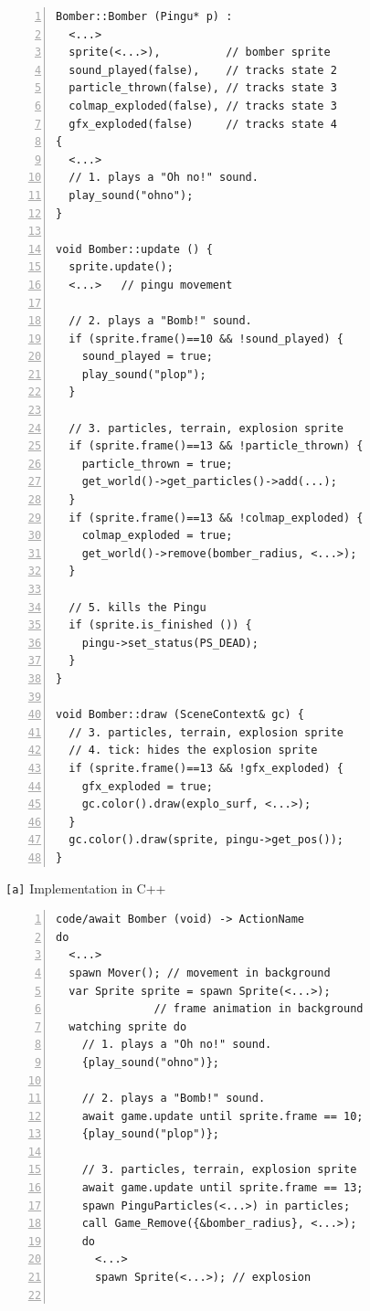 \documentclass{vgtc}                          %
\newcommand{\code}[1] {{\small{\texttt{#1}}}}
\newcommand{\ax}{\code{[a]}\xspace}
\begin{document}
\begin{figure}[th!]
\begin{minipage}[t]{0.50\linewidth}
\begin{lstlisting}[numbers=left,xleftmargin=3em]
Bomber::Bomber (Pingu* p) :
  <...>
  sprite(<...>),          // bomber sprite
  sound_played(false),    // tracks state 2
  particle_thrown(false), // tracks state 3
  colmap_exploded(false), // tracks state 3
  gfx_exploded(false)     // tracks state 4
{
  <...>
  // 1. plays a "Oh no!" sound.
  play_sound("ohno");
}

void Bomber::update () {
  sprite.update();
  <...>   // pingu movement

  // 2. plays a "Bomb!" sound.
  if (sprite.frame()==10 && !sound_played) {
    sound_played = true;
    play_sound("plop");
  }

  // 3. particles, terrain, explosion sprite
  if (sprite.frame()==13 && !particle_thrown) {
    particle_thrown = true;
    get_world()->get_particles()->add(...);
  }
  if (sprite.frame()==13 && !colmap_exploded) {
    colmap_exploded = true;
    get_world()->remove(bomber_radius, <...>);
  }

  // 5. kills the Pingu
  if (sprite.is_finished ()) {
    pingu->set_status(PS_DEAD);
  }
}

void Bomber::draw (SceneContext& gc) {
  // 3. particles, terrain, explosion sprite
  // 4. tick: hides the explosion sprite
  if (sprite.frame()==13 && !gfx_exploded) {
    gfx_exploded = true;
    gc.color().draw(explo_surf, <...>);
  }
  gc.color().draw(sprite, pingu->get_pos());
}
\end{lstlisting}
\centering\small{\ax Implementation in C++}
\end{minipage}
%
\begin{minipage}[t]{0.50\linewidth}
\begin{lstlisting}[numbers=left,xleftmargin=3em]
code/await Bomber (void) -> ActionName
do
  <...>
  spawn Mover(); // movement in background
  var Sprite sprite = spawn Sprite(<...>);
               // frame animation in background
  watching sprite do
    // 1. plays a "Oh no!" sound.
    {play_sound("ohno")};

    // 2. plays a "Bomb!" sound.
    await game.update until sprite.frame == 10;
    {play_sound("plop")};

    // 3. particles, terrain, explosion sprite
    await game.update until sprite.frame == 13;
    spawn PinguParticles(<...>) in particles;
    call Game_Remove({&bomber_radius}, <...>);
    do
      <...>
      spawn Sprite(<...>); // explosion


\end{lstlisting}
\end{minipage}
\end{figure}
\end{document}
